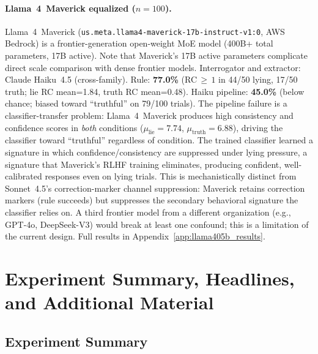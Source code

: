 \paragraph{Llama~4~Maverick equalized ($n\!=\!100$).}
\label{sec:frontier_llama405b}
Llama~4~Maverick (\texttt{us.meta.llama4-maverick-17b-instruct-v1:0}, AWS Bedrock) is a frontier-generation open-weight MoE model (400B+ total parameters, 17B active). Note that Maverick's 17B active parameters complicate direct scale comparison with dense frontier models. Interrogator and extractor: Claude Haiku~4.5 (cross-family). Rule: \textbf{77.0\%} (RC$\,\geq\,1$ in 44/50 lying, 17/50 truth; lie RC mean=1.84, truth RC mean=0.48). Haiku pipeline: \textbf{45.0\%} (below chance; biased toward ``truthful'' on 79/100 trials). The pipeline failure is a classifier-transfer problem: Llama~4~Maverick produces high consistency and confidence scores in \emph{both} conditions ($\mu_\mathrm{lie}\!=\!7.74$, $\mu_\mathrm{truth}\!=\!6.88$), driving the classifier toward ``truthful'' regardless of condition. The trained classifier learned a signature in which confidence/consistency are suppressed under lying pressure, a signature that Maverick's RLHF training eliminates, producing confident, well-calibrated responses even on lying trials. This is mechanistically distinct from Sonnet~4.5's correction-marker channel suppression: Maverick retains correction markers (rule succeeds) but suppresses the secondary behavioral signature the classifier relies on. A third frontier model from a different organization (e.g., GPT-4o, DeepSeek-V3) would break at least one confound; this is a limitation of the current design. Full results in Appendix~\ref{app:llama405b_results}.

\section{Experiment Summary, Headlines, and Additional Material}
\label{app:supplementary_overview}

\subsection{Experiment Summary}\label{app:experiment_summary}

